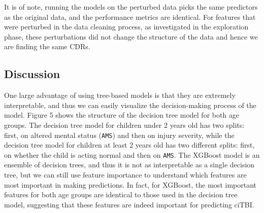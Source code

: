 \documentclass[10pt,letterpaper]{article}
\begin{document}
It is of note, running the models on the perturbed data picks the same predictors as the original data, and the performance metrics are identical. For features that were perturbed in the data cleaning process, as investigated in the exploration phase, these perturbations did not change the structure of the data and hence we are finding the same CDRs.

\subsection{Discussion}

One large advantage of using tree-based models is that they are extremely interpretable, and thus we can easily visualize the decision-making process of the model. Figure 5 shows the structure of the decision tree model for both age groups. The decision tree model for children under 2 years old has two splits: first, on altered mental status (\texttt{AMS}) and then on injury severity, while the decision tree model for children at least 2 years old has two different splits: first, on whether the child is acting normal and then on \texttt{AMS}. The XGBoost model is an ensemble of decision trees, and thus it is not as interpretable as a single decision tree, but we can still use feature importance to understand which features are most important in making predictions. In fact, for XGBoost, the most important features for both age groups are identical to those used in the decision tree model, suggesting that these features are indeed important for predicting ciTBI.
\end{document}
